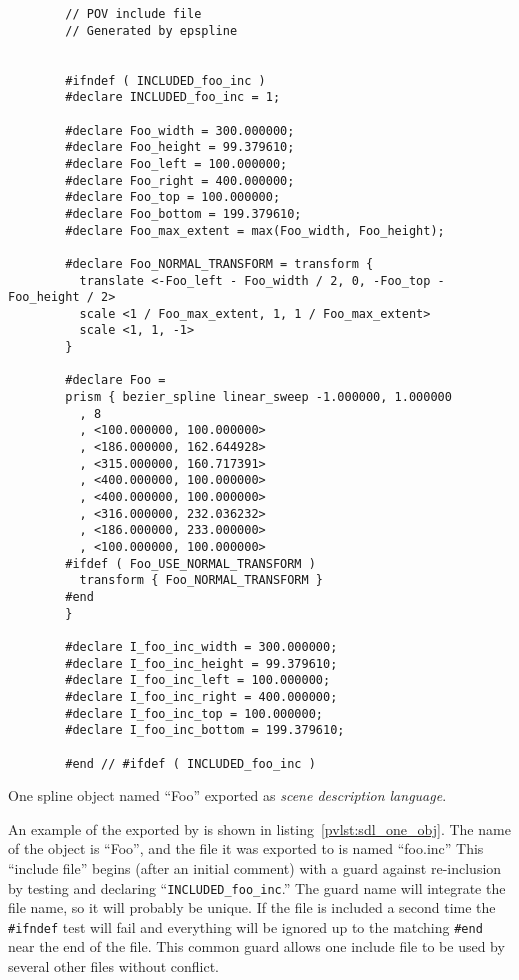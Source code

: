 	\begin{povsdl}
		{\small
		\begin{verbatim}
		// POV include file
		// Generated by epspline
		
		
		#ifndef ( INCLUDED_foo_inc )
		#declare INCLUDED_foo_inc = 1;
		
		#declare Foo_width = 300.000000;
		#declare Foo_height = 99.379610;
		#declare Foo_left = 100.000000;
		#declare Foo_right = 400.000000;
		#declare Foo_top = 100.000000;
		#declare Foo_bottom = 199.379610;
		#declare Foo_max_extent = max(Foo_width, Foo_height);
		
		#declare Foo_NORMAL_TRANSFORM = transform {
		  translate <-Foo_left - Foo_width / 2, 0, -Foo_top - Foo_height / 2>
		  scale <1 / Foo_max_extent, 1, 1 / Foo_max_extent>
		  scale <1, 1, -1>
		}
		
		#declare Foo =
		prism { bezier_spline linear_sweep -1.000000, 1.000000
		  , 8
		  , <100.000000, 100.000000>
		  , <186.000000, 162.644928>
		  , <315.000000, 160.717391>
		  , <400.000000, 100.000000>
		  , <400.000000, 100.000000>
		  , <316.000000, 232.036232>
		  , <186.000000, 233.000000>
		  , <100.000000, 100.000000>
		#ifdef ( Foo_USE_NORMAL_TRANSFORM )
		  transform { Foo_NORMAL_TRANSFORM }
		#end
		}
		
		#declare I_foo_inc_width = 300.000000;
		#declare I_foo_inc_height = 99.379610;
		#declare I_foo_inc_left = 100.000000;
		#declare I_foo_inc_right = 400.000000;
		#declare I_foo_inc_top = 100.000000;
		#declare I_foo_inc_bottom = 199.379610;
		
		#end // #ifdef ( INCLUDED_foo_inc )
		\end{verbatim}
		}%
	\caption{One spline object named ``Foo'' exported as
		\emph{scene description language}.}
	\label{pvlst:sdl_one_obj}
	\end{povsdl}

	An example of the  exported by \IXpkg{}
	is shown in listing~\ref{pvlst:sdl_one_obj}.
	The name of the object is ``Foo'', and the file it was
	exported to is named ``foo.inc''
	This ``include file'' begins (after an initial
	comment) with a guard against re-inclusion by testing and
	declaring
	``\texttt{INCLUDED\_foo\_inc}.''
	The guard name will
	integrate the file name, so it will probably
	be unique. If the file is
	included a second time the \texttt{\#ifndef} test will fail
	and everything will be ignored up to the matching
	\texttt{\#end} near the end of the file. This common guard
	allows one include file to be used by several other files
	without conflict.
	
